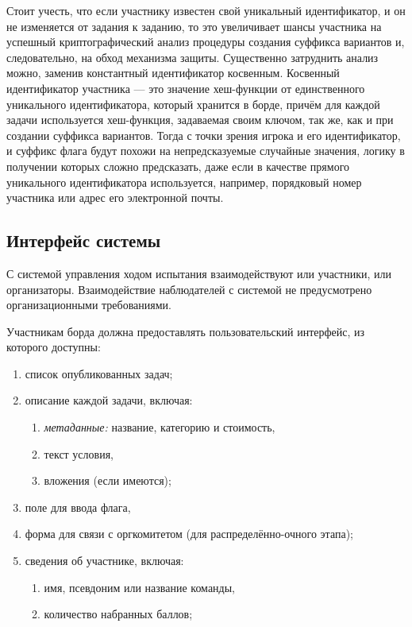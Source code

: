 Стоит учесть, что если участнику известен свой уникальный идентификатор, и он не изменяется от задания к заданию, то это увеличивает шансы участника на успешный криптографический анализ процедуры создания суффикса вариантов и, следовательно, на обход механизма защиты. Существенно затруднить анализ можно, заменив константный идентификатор косвенным. Косвенный идентификатор участника — это значение хеш-функции от единственного уникального идентификатора, который хранится в борде, причём для каждой задачи используется хеш-функция, задаваемая своим ключом, так же, как и при создании суффикса вариантов. Тогда с точки зрения игрока и его идентификатор, и суффикс флага будут похожи на непредсказуемые случайные значения, логику в получении которых сложно предсказать, даже если в качестве прямого уникального идентификатора используется, например, порядковый номер участника или адрес его электронной почты.



\subsection{Интерфейс системы}

С системой управления ходом испытания взаимодействуют или участники, или организаторы. Взаимодействие наблюдателей с системой не предусмотрено организационными требованиями.

Участникам борда должна предоставлять пользовательский интерфейс, из которого доступны:
\begin{enumerate}
\item список опубликованных задач;
\item описание каждой задачи, включая:
  \begin{enumerate}
  \item \textit{метаданные:} название, категорию и стоимость,
  \item текст условия,
  \item вложения (если имеются);
  \end{enumerate}
\item поле для ввода флага,
\item форма для связи с оргкомитетом (для распределённо-очного этапа);
\item сведения об участнике, включая:
  \begin{enumerate}
  \item имя, псевдоним или название команды,
  \item количество набранных баллов;
  \end{enumerate}
\end{enumerate}

